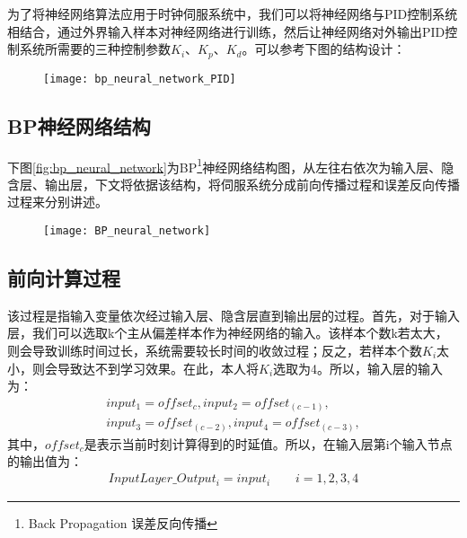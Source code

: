 为了将神经网络算法应用于时钟伺服系统中，我们可以将神经网络与PID控制系统相结合，通过外界输入样本对神经网络进行训练，然后让神经网络对外输出PID控制系统所需要的三种控制参数$K_{i}$、$K_{p}$、$K_{d}$。可以参考下图的结构设计：

\begin{figure}[!hbp]
  \centering
  \begin{minipage}[b]{0.6\textwidth}
    \captionstyle{\centering}
    \centering
    \texttt{[image: bp\_neural\_network\_PID]}
  \end{minipage}     
\end{figure}

\subsection{BP神经网络结构}
下图\ref{fig:bp_neural_network}为BP\footnote{Back Propagation 误差反向传播}神经网络结构图，从左往右依次为输入层、隐含层、输出层，下文将依据该结构，将伺服系统分成前向传播过程和误差反向传播过程来分别讲述。
\begin{figure}[!hbp]
  \centering
  \begin{minipage}[b]{0.6\textwidth}
    \captionstyle{\centering}
    \centering
    \texttt{[image: BP\_neural\_network]}
  \end{minipage}     
\end{figure}

\subsection{前向计算过程}
该过程是指输入变量依次经过输入层、隐含层直到输出层的过程。首先，对于输入层，我们可以选取k个主从偏差样本作为神经网络的输入。该样本个数k若太大，则会导致训练时间过长，系统需要较长时间的收敛过程；反之，若样本个数$K_{i}$太小，则会导致达不到学习效果。在此，本人将$K_{i}$选取为4。所以，输入层的输入为：
\begin{align}
	input_{1} = offset_{c}, input_{2} = offset_{(c-1)}, \\
	input_{3} = offset_{(c-2)}, input_{4} = offset_{(c-3)}, 
\end{align}
其中，$offset_{c}$是表示当前时刻计算得到的时延值。所以，在输入层第i个输入节点的输出值为：
\begin{align}
	InputLayer\_Output_{i} = input_{i} \qquad i = 1, 2, 3, 4
\end{align}

